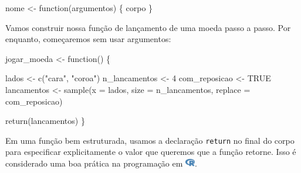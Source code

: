 \documentclass[
  letterpaper,
]{book}
\newenvironment{Shaded}{\begin{snugshade}}{\end{snugshade}}
\newcommand{\AttributeTok}[1]{\textcolor[rgb]{0.40,0.45,0.13}{#1}}
\newcommand{\ConstantTok}[1]{\textcolor[rgb]{0.56,0.35,0.01}{#1}}
\newcommand{\ControlFlowTok}[1]{\textcolor[rgb]{0.00,0.23,0.31}{#1}}
\newcommand{\DecValTok}[1]{\textcolor[rgb]{0.68,0.00,0.00}{#1}}
\newcommand{\FunctionTok}[1]{\textcolor[rgb]{0.28,0.35,0.67}{#1}}
\newcommand{\NormalTok}[1]{\textcolor[rgb]{0.00,0.23,0.31}{#1}}
\newcommand{\OtherTok}[1]{\textcolor[rgb]{0.00,0.23,0.31}{#1}}
\newcommand{\StringTok}[1]{\textcolor[rgb]{0.13,0.47,0.30}{#1}}
\theoremstyle{definition}
\theoremstyle{plain}
\theoremstyle{remark}
\begin{document}
\begin{Shaded}
\begin{Highlighting}[]
\NormalTok{nome }\OtherTok{\textless{}{-}} \ControlFlowTok{function}\NormalTok{(argumentos) \{}
\NormalTok{  corpo}
\NormalTok{\}}
\end{Highlighting}
\end{Shaded}

Vamos construir nossa função de lançamento de uma moeda passo a passo.
Por enquanto, começaremos sem usar argumentos:

\begin{Shaded}
\begin{Highlighting}[]
\NormalTok{jogar\_moeda }\OtherTok{\textless{}{-}} \ControlFlowTok{function}\NormalTok{() \{}
  
\NormalTok{  lados }\OtherTok{\textless{}{-}} \FunctionTok{c}\NormalTok{(}\StringTok{"cara"}\NormalTok{, }\StringTok{"coroa"}\NormalTok{)}
\NormalTok{  n\_lancamentos }\OtherTok{\textless{}{-}} \DecValTok{4}
\NormalTok{  com\_reposicao }\OtherTok{\textless{}{-}} \ConstantTok{TRUE}
\NormalTok{  lancamentos }\OtherTok{\textless{}{-}} \FunctionTok{sample}\NormalTok{(}\AttributeTok{x =}\NormalTok{ lados, }
                        \AttributeTok{size =}\NormalTok{ n\_lancamentos, }
                        \AttributeTok{replace =}\NormalTok{ com\_reposicao)}
  
  \FunctionTok{return}\NormalTok{(lancamentos)}
\NormalTok{\}}
\end{Highlighting}
\end{Shaded}

\begin{tcolorbox}[enhanced jigsaw, coltitle=black, titlerule=0mm, opacitybacktitle=0.6, title=\textcolor{quarto-callout-tip-color}{\faLightbulb}\hspace{0.5em}{Dica}, bottomrule=.15mm, colbacktitle=quarto-callout-tip-color!10!white, colback=white, toptitle=1mm, arc=.35mm, left=2mm, breakable, rightrule=.15mm, opacityback=0, colframe=quarto-callout-tip-color-frame, leftrule=.75mm, bottomtitle=1mm, toprule=.15mm]

Em uma função bem estruturada, usamos a declaração \texttt{return} no
final do corpo para especificar explicitamente o valor que queremos que
a função retorne. Isso é considerado uma boa prática na programação em
\includegraphics[width=1.13em,height=1em]{getting_started_with_r_files/figure-pdf/fa-icon-9b00320707d42527dde67262afb33ded.pdf}.

\end{tcolorbox}
\end{document}
